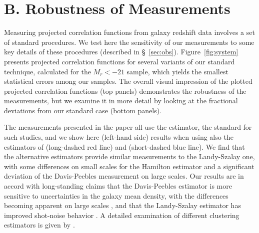 \documentclass[]{emulateapj}
\begin{document}
\section{B. Robustness of Measurements}
\label{sec:systematics}

Measuring projected correlation functions from galaxy redshift data involves
a set of standard procedures. We test here the sensitivity
of our measurements to some key details of these procedures (described in 
\S~\ref{sec:obs}).
Figure~\ref{fig:system} presents projected correlation functions for 
several variants of our standard technique, calculated for the 
$M_r<-21$ sample, which yields the smallest statistical
errors among our samples.  
The overall visual impression of the plotted projected correlation 
functions (top panels) 
demonstrates the robustness of the measurements, but we examine
it in more detail by looking at the fractional deviations from our
standard case (bottom panels).


\begin{figure*}[tbp]
\caption[]{\label{fig:system}
Robustness of the $w_p$ measurements to different uncertainties.
Top panels show projected correlation functions for different variants 
of our standard procedures (see text) calculated for the 
$M_r<-21$ sample. Points with errorbars represent our standard
measurements for this sample.  Bottom panels show the fractional 
deviations of these variants compared to our standard case. For
clarity, errorbars are shown only for the latter, and are comparable
for all other cases.
}
\end{figure*}


The measurements presented in the paper all use the \citet{landy93} 
estimator, the standard for such studies, and we show here (left-hand
side) results when using
also the estimators of \citet{hamilton93} (long-dashed red line) and 
\citet{davis83} (short-dashed blue line).
We find that the alternative estimators provide similar measurements 
to the Landy-Szalay one, with some differences on small scales for the 
Hamilton estimator and a significant deviation of the Davis-Peebles 
measurement on large scales.
Our results are in accord with long-standing claims that the Davis-Peebles
estimator is more sensitive to uncertainties in the galaxy mean density,
with the differences becoming apparent on large scales 
\citep{hamilton93,strauss95,pons99}, and that the Landy-Szalay estimator
has improved shot-noise behavior \citep{landy93,szapudi98}.
A detailed examination of different clustering estimators is given
by \citet{pons99}.
\end{document}

